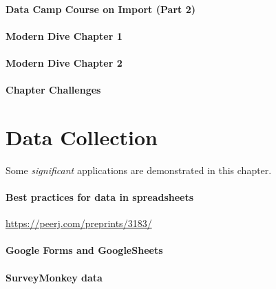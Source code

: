 \documentclass[]{book}
\theoremstyle{definition}
\theoremstyle{definition}
\theoremstyle{definition}
\theoremstyle{remark}
\begin{document}
\hypertarget{data-camp-course-on-import-part-2}{%
\subsubsection{Data Camp Course on Import (Part
2)}\label{data-camp-course-on-import-part-2}}

\hypertarget{modern-dive-chapter-1}{%
\subsubsection{Modern Dive Chapter 1}\label{modern-dive-chapter-1}}

\hypertarget{modern-dive-chapter-2}{%
\subsubsection{Modern Dive Chapter 2}\label{modern-dive-chapter-2}}

\hypertarget{chapter-challenges}{%
\subsubsection{Chapter Challenges}\label{chapter-challenges}}

\hypertarget{data-collection}{%
\chapter{Data Collection}\label{data-collection}}

Some \emph{significant} applications are demonstrated in this chapter.

\hypertarget{best-practices-for-data-in-spreadsheets}{%
\subsubsection{Best practices for data in
spreadsheets}\label{best-practices-for-data-in-spreadsheets}}

\url{https://peerj.com/preprints/3183/}

\hypertarget{google-forms-and-googlesheets}{%
\subsubsection{Google Forms and
GoogleSheets}\label{google-forms-and-googlesheets}}

\hypertarget{surveymonkey-data}{%
\subsubsection{SurveyMonkey data}\label{surveymonkey-data}}
\end{document}
